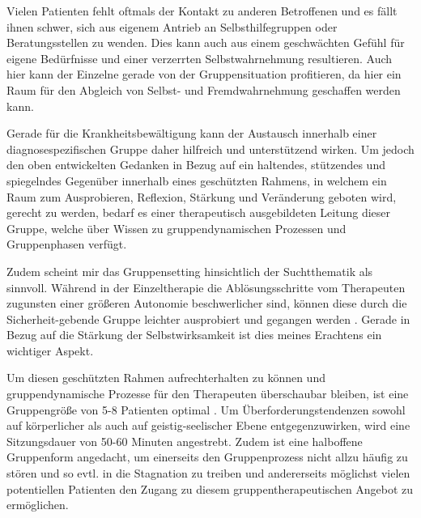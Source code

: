 Vielen Patienten fehlt oftmals der Kontakt zu anderen Betroffenen und es fällt ihnen schwer, sich aus eigenem Antrieb an Selbsthilfegruppen oder Beratungsstellen zu wenden. Dies kann auch aus einem geschwächten Gefühl für eigene Bedürfnisse und einer verzerrten Selbstwahrnehmung resultieren. Auch hier kann der Einzelne gerade von der Gruppensituation profitieren, da hier ein Raum für den Abgleich von Selbst- und Fremdwahrnehmung geschaffen werden kann.

Gerade für die Krankheitsbewältigung kann der Austausch innerhalb einer diagnosespezifischen Gruppe daher hilfreich und unterstützend wirken. Um jedoch den oben entwickelten Gedanken in Bezug auf ein haltendes, stützendes und spiegelndes Gegenüber innerhalb eines geschützten Rahmens, in welchem ein Raum zum Ausprobieren, Reflexion, Stärkung und Veränderung geboten wird, gerecht zu werden, bedarf es einer therapeutisch ausgebildeten Leitung dieser Gruppe, welche über Wissen zu gruppendynamischen Prozessen und Gruppenphasen verfügt. 

Zudem scheint mir das Gruppensetting hinsichtlich der Suchtthematik als sinnvoll. Während in der Einzeltherapie die Ablösungsschritte vom Therapeuten zugunsten einer größeren Autonomie beschwerlicher sind, können diese durch die Sicherheit-gebende Gruppe leichter ausprobiert und gegangen werden \autocite[vgl.][]{nawe2014}. Gerade in Bezug auf die Stärkung der Selbstwirksamkeit ist dies meines Erachtens ein wichtiger Aspekt.

Um diesen geschützten Rahmen aufrechterhalten zu können und gruppendynamische Prozesse für den Therapeuten überschaubar bleiben, ist eine Gruppengröße von 5-8 Patienten optimal \autocite[vgl.][]{weber2013}. Um Überforderungstendenzen sowohl auf körperlicher als auch auf geistig-seelischer Ebene entgegenzuwirken, wird eine Sitzungsdauer von 50-60 Minuten angestrebt. Zudem ist eine halboffene Gruppenform angedacht, um einerseits den Gruppenprozess nicht allzu häufig zu stören und so evtl. in die Stagnation zu treiben und andererseits möglichst vielen potentiellen Patienten den Zugang zu diesem gruppentherapeutischen Angebot zu ermöglichen. 

